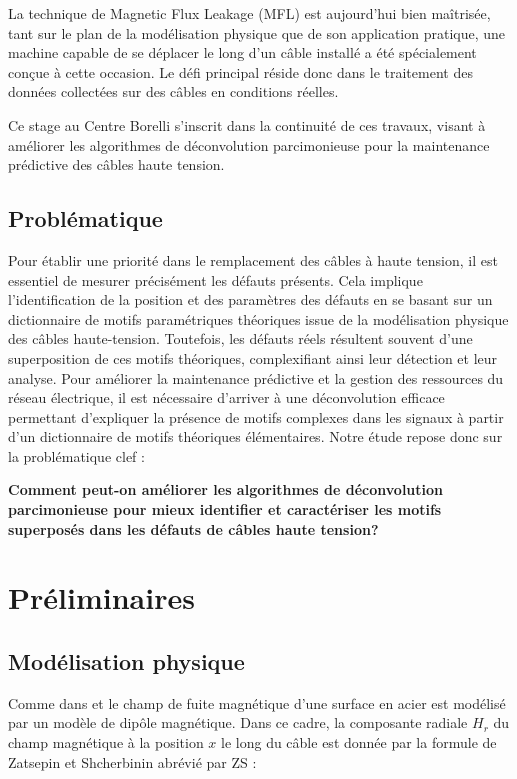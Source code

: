 \documentclass[9pt,a4paper,twoside]{rho}
\begin{document}
La technique de Magnetic Flux Leakage (MFL) est aujourd'hui bien maîtrisée, tant sur le plan de la modélisation physique que de son application pratique, une machine capable de se déplacer le long d'un câble installé a été spécialement conçue à cette occasion.
Le défi principal réside donc dans le traitement des données collectées sur des câbles en conditions réelles. 

Ce stage au Centre Borelli s'inscrit dans la continuité de ces travaux, visant à améliorer les algorithmes de déconvolution parcimonieuse pour la maintenance prédictive des câbles haute tension.


\subsection{Problématique}

Pour établir une priorité dans le remplacement des câbles à haute tension, il est essentiel de mesurer précisément les défauts présents. 
Cela implique l'identification de la position et des paramètres des défauts en se basant sur un dictionnaire de motifs paramétriques théoriques issue de la modélisation physique des câbles haute-tension. 
Toutefois, les défauts réels résultent souvent d'une superposition de ces motifs théoriques, complexifiant ainsi leur détection et leur analyse.
Pour améliorer la maintenance prédictive et la gestion des ressources du réseau électrique, il est nécessaire d'arriver à une déconvolution efficace permettant d'expliquer la présence de motifs complexes dans les signaux à partir d'un dictionnaire de motifs théoriques élémentaires.
Notre étude repose donc sur la problématique clef :

\begin{center}
    \textbf{Comment peut-on améliorer les algorithmes de déconvolution parcimonieuse pour mieux identifier et caractériser les motifs superposés dans les défauts de câbles haute tension?}
\end{center}


\section{Préliminaires}

\subsection{Modélisation physique}

Comme dans \cite{broken_wire} et \cite{localized_defects_omp} le champ de fuite magnétique d'une surface en acier est modélisé par un modèle de dipôle magnétique.
Dans ce cadre, la composante radiale $H_r$ du champ magnétique à la position $x$ le long du câble est donnée par la formule de Zatsepin et Shcherbinin abrévié par ZS :
\end{document}
